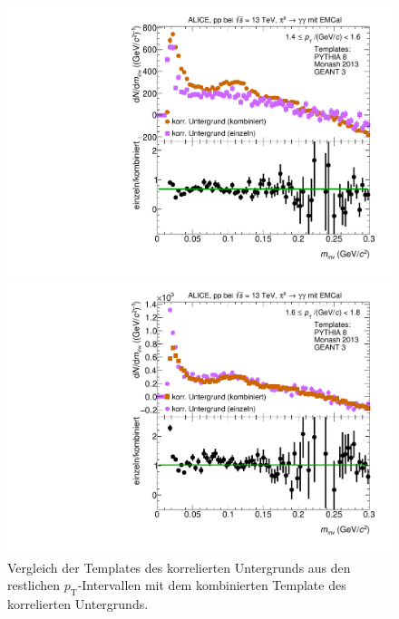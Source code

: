 \begin{figure}[t!]
\begin{multicols}{2}
	\centering
    \includegraphics[width=.65\linewidth]{Anhang/BackgroundWithRatio01_Data_2016.pdf}\par 
    \includegraphics[width=.65\linewidth]{Anhang/BackgroundWithRatio02_Data_2016.pdf}\par 
\end{multicols}
\caption{Vergleich der Templates des korrelierten Untergrunds aus den restlichen $p_\text{T}$-Intervallen mit dem kombinierten Template des korrelierten Untergrunds.}
\label{fig:OtherRatios}
\end{figure}
\clearpage


